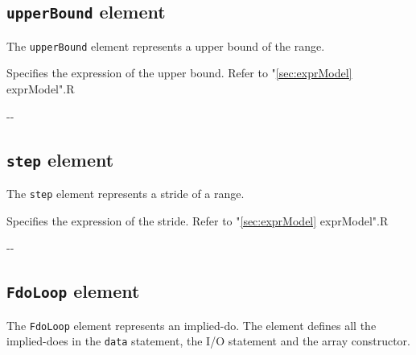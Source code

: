 \subsection{ {\tt upperBound} element}

The {\tt upperBound} element represents a upper bound of the range.


\begin{XcodeMLChildElements}
{Specifies the expression of the upper bound. Refer to "\ref{sec:exprModel} exprModel".}{R}
\end{XcodeMLChildElements}

\begin{XcodeMLAttributes}
\XcodeMLAttrDef{-}{-}
{-}{-}
\end{XcodeMLAttributes}


\subsection{ {\tt step} element}

The {\tt step} element represents a stride of a range.


\begin{XcodeMLChildElements}
{Specifies the expression of the stride. Refer to "\ref{sec:exprModel} exprModel".}{R}
\end{XcodeMLChildElements}

\begin{XcodeMLAttributes}
\XcodeMLAttrDef{-}{-}
{-}{-}
\end{XcodeMLAttributes}


\subsection{ {\tt FdoLoop} element}

The {\tt FdoLoop} element represents an implied-do.
The element defines all the implied-does in the {\tt data} statement, the I/O statement and the array constructor.

